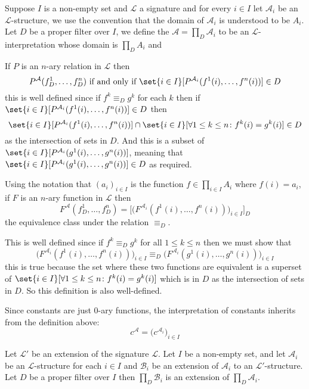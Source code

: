 \documentclass[10pt]{article}
\def\mA{\mathcal{A}}
\def\mB{\mathcal{B}}
\def\mL{\mathcal{L}}
\begin{document}
\begin{defn*}

    Suppose $I$ is a non-empty set and $\mL$ a signature and for every $i\in I$ let $\mA_i$ be an $\mL$-structure, we use the convention that the domain of $\mA_i$ is understood to be $A_i$.
    Let $D$ be a proper filter over $I$, we define the  $\mA=\prod_D\mA_i$ to be an $\mL$-interpretation whose domain is $\prod_DA_i$ and
    \blist
        \item If $P$ is an $n$-ary relation in $\mL$ then
        \[ P^\mA(f_D^1,\dots,f_D^n) \text{ if and only if } \set{i\in I}[P^{\mA_i}(f^1(i),\dots,f^n(i))] \in D \]
        this is well defined since if $f^k\equiv_D g^k$ for each $k$ then if $\set{i\in I}[P^{\mA_i}(f^1(i),\dots,f^n(i))]\in D$ then 
        \[ \set{i\in I}[P^{\mA_i}(f^1(i),\dots,f^n(i))]\cap\set{i\in I}[\forall 1\leq k\leq n\colon f^k(i)=g^k(i)] \in D \]
        as the intersection of sets in $D$.
        And this is a subset of $\set{i\in I}[P^{\mA_i}(g^1(i),\dots,g^n(i))]$, meaning that\hfil\break $\set{i\in I}[P^{\mA_i}(g^1(i),\dots,g^n(i))]\in D$ as required.

        \item Using the notation that $(a_i)_{i\in I}$ is the function $f\in\prod_{i\in I}A_i$ where $f(i)=a_i$, if $F$ is an $n$-ary function in $\mL$ then
        \[ F^\mA(f^1_D,\dots,f^n_D) = \Bigr[\bigl(F^{\mA_i}(f^1(i),\dots,f^n(i))\bigr)_{i\in I}\Bigr]_D \]
        the equivalence class under the relation $\equiv_D$.

        This is well defined since if $f^k\equiv_D g^k$ for all $1\leq k\leq n$ then we must show that
        \[ \bigl(F^{\mA_i}(f^1(i),\dots,f^n(i))\bigr)_{i\in I} \equiv_D \bigl(F^{\mA_i}(g^1(i),\dots,g^n(i))\bigr)_{i\in I} \]
        this is true because the set where these two functions are equivalent is a superset of\hfil\break
        $\set{i\in I}[\forall 1\leq k\leq n\colon f^k(i)=g^k(i)]$ which is in $D$ as the intersection of sets in $D$.
        So this definition is also well-defined.

        \item Since constants are just $0$-ary functions, the interpretation of constants inherits from the definition above:
        \[ c^\mA = \bigl(c^{\mA_i}\bigr)_{i\in I} \]
    \elist

\end{defn*}

\begin{thrm*}

    Let $\mL'$ be an extension of the signature $\mL$.
    Let $I$ be a non-empty set, and let $\mA_i$ be an $\mL$-structure for each $i\in I$ and $\mB_i$ be an extension of $\mA_i$ to an $\mL'$-structure.
    Let $D$ be a proper filter over $I$ then $\prod_D\mB_i$ is an extension of $\prod_D\mA_i$.

\end{thrm*}
\end{document}
